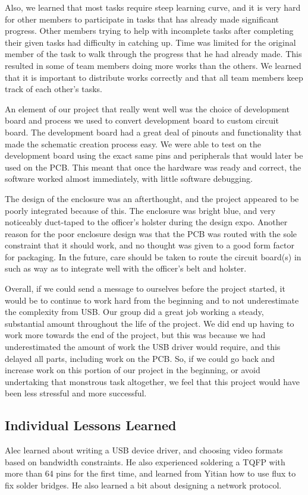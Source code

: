 \documentclass[12pt]{article}
\begin{document}
Also, we learned that most tasks require steep learning curve, and it is
very hard for other members to participate in tasks that has already made
significant progress. Other members trying to help with incomplete tasks after completing their
given tasks had difficulty in catching up. Time
was limited for the original member of the task to walk through the progress
that he had already made. This resulted in some of team members doing more
works than the others. We learned that it is important to distribute works
correctly and that all team members keep track of each other's tasks.

An element of our project that really went well was the choice of development
board and process we used to convert development board to custom circuit board.
The development board had a great deal of pinouts and functionality that made
the schematic creation process easy. We were able to test on the development
board using the exact same pins and peripherals that would later be used on the
PCB. This meant that once the hardware was ready and correct, the software
worked almost immediately, with little software debugging.

The design of the enclosure was an afterthought, and the project appeared to be
poorly integrated because of this. The enclosure was bright blue, and very
noticeably duct-taped to the officer's holster during the design expo. Another
reason for the poor enclosure design was that the PCB was routed with the sole
constraint that it should work, and no thought was given to a good form factor
for packaging. In the future, care should be taken to route the circuit
board(s) in such as way as to integrate well with the officer's belt and
holster.

Overall, if we could send a message to ourselves before the project started, it
would be to continue to work hard from the beginning and to not underestimate
the complexity from USB. Our group did a great job working a steady,
substantial amount throughout the life of the project. We did end up having to
work more towards the end of the project, but this was because we had
underestimated the amount of work the USB driver would require, and this
delayed all parts, including work on the PCB. So, if we could go back and
increase work on this portion of our project in the beginning, or avoid
undertaking that monstrous task altogether, we feel that this project would
have been less stressful and more successful.

\subsection{Individual Lessons Learned}
Alec learned about writing a USB device driver, and choosing video formats
based on bandwidth constraints. He also experienced soldering a TQFP with more
than 64 pins for the first time, and learned from Yitian how to use flux to fix
solder bridges. He also learned a bit about designing a network protocol.
\end{document}

